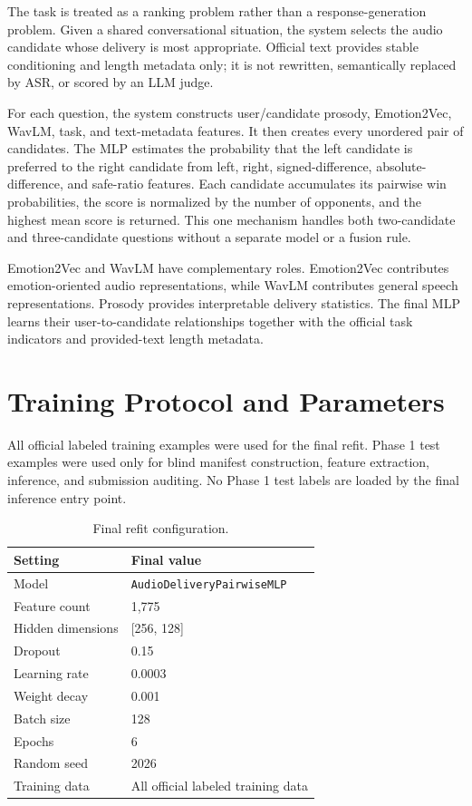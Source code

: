 \documentclass[11pt]{article}
\begin{document}
The task is treated as a ranking problem rather than a response-generation
problem. Given a shared conversational situation, the system selects the audio
candidate whose delivery is most appropriate. Official text provides stable
conditioning and length metadata only; it is not rewritten, semantically
replaced by ASR, or scored by an LLM judge.

For each question, the system constructs user/candidate prosody, Emotion2Vec,
WavLM, task, and text-metadata features. It then creates every unordered pair
of candidates. The MLP estimates the probability that the left candidate is
preferred to the right candidate from left, right, signed-difference,
absolute-difference, and safe-ratio features. Each candidate accumulates its
pairwise win probabilities, the score is normalized by the number of opponents,
and the highest mean score is returned. This one mechanism handles both
two-candidate and three-candidate questions without a separate model or a
fusion rule.

Emotion2Vec and WavLM have complementary roles. Emotion2Vec contributes
emotion-oriented audio representations, while WavLM contributes general speech
representations. Prosody provides interpretable delivery statistics. The final
MLP learns their user-to-candidate relationships together with the official
task indicators and provided-text length metadata.

\section{Training Protocol and Parameters}

All official labeled training examples were used for the final refit. Phase 1
test examples were used only for blind manifest construction, feature
extraction, inference, and submission auditing. No Phase 1 test labels are
loaded by the final inference entry point.

\begin{table}[h]
\centering
\small
\begin{tabular}{@{}ll@{}}
\toprule
Setting & Final value \\
\midrule
Model & \texttt{AudioDeliveryPairwiseMLP} \\
Feature count & 1,775 \\
Hidden dimensions & [256, 128] \\
Dropout & 0.15 \\
Learning rate & 0.0003 \\
Weight decay & 0.001 \\
Batch size & 128 \\
Epochs & 6 \\
Random seed & 2026 \\
Training data & All official labeled training data \\
\bottomrule
\end{tabular}
\caption{Final refit configuration.}
\end{table}
\end{document}
